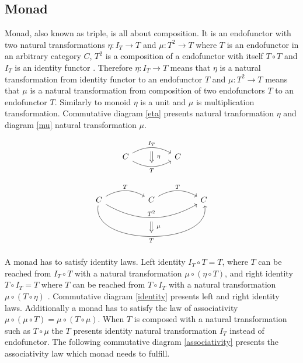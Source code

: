 \documentclass[article]{aaltoseries}
\begin{document}
  \subsection{Monad}
    Monad, also known as triple, is all about composition. It is an endofunctor
    with two natural transformations $\eta : I_T \rightarrow T$ and $\mu : T^2
    \rightarrow T$ where $T$ is an endofunctor in an arbitrary category $C$,
    $T^2$ is a composition of a endofunctor with itself $T \circ T$ and $I_T$ is
    an identity functor \cite{barr1990category, moggi1989computational}.
    Therefore $\eta : I_T \rightarrow T$ means that $\eta$ is a natural
    transformation from identity functor to an endofunctor $T$ and $\mu : T^2
    \rightarrow T$ means that $\mu$ is a natural transformation from composition
    of two endofunctors $T$ to an endofunctor $T$. Similarly to monoid $\eta$ is
    a unit and $\mu$ is multiplication transformation. Commutative diagram
    \ref{eta} presents natural tranformation $\eta$ and diagram \ref{mu} natural
    transformation $\mu$.
    
    \begin{equation}
      \label{eta}
      \begin{tikzcd}[column sep=huge]
        C \arrow[r, bend left, "I_T", ""{name=A, below}]
        \arrow[r, bend right, "T"{below}, ""{name=B}]
        & C
        \arrow[Rightarrow, from=A, to=B, "\eta"{right=4}]
      \end{tikzcd}
    \end{equation}

    \begin{equation}
      \label{mu}
      \begin{tikzcd}[column sep=huge]
        C \arrow[r, bend left, "T"]
        \arrow[rr, bend right=30, "T^2", ""{name=A, below}]
        \arrow[rr, bend right=100, "T"{below}, ""{name=B}]
        & C
        \arrow[r, bend left, "T"]
        & C
        \arrow[Rightarrow, from=A, to=B, "\mu"{right=4}]
      \end{tikzcd}
    \end{equation}

    A monad has to satisfy identity laws. Left identity $I_T \circ T = T$, where
    $T$ can be reached from $I_T \circ T$ with a natural transformation
    $\mu \circ (\eta \circ T)$, and right identity $T \circ I_T = T$ where $T$
    can be reached from $T \circ I_T$ with a natural transformation $\mu \circ
    (T \circ \eta)$ \cite{mac2013categories, moggi1989computational}.
    Commutative diagram \ref{identity} presents left and right identity laws.
    Additionally a monad has to satisfy the law of associativity $\mu \circ (\mu
    \circ T) = \mu \circ (T \circ \mu)$. When $T$ is composed with a natural
    transformation such as $T \circ \mu$ the $T$ presents identity natural
    transformation $I_T$ instead of endofunctor. The following commutative
    diagram \ref{associativity} presents the associativity law which monad needs
    to fulfill.
\end{document}
